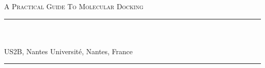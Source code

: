 
\begin{titlepage}
    \colorbox{black!5}{
        \parbox[t]{0.975\textwidth}{%
            \parbox[t]{0.95\textwidth}{%
                \raggedleft\vspace{0.75cm}\Huge\scshape
                A Practical Guide To Molecular Docking \\[7.5pt]
                \large\bf
                \vspace{0.75cm}
            }
        }}

    \vfill

    \parbox[t]{0.95\textwidth}{%
        \hfill\rule{0.15\linewidth}{0.5pt}\\[7.5pt]
        \raggedleft
        \textcopyright{}\\ [4pt]
        US2B, Nantes Université, Nantes, France\\

        \hfill\rule{0.15\linewidth}{0.5pt}}

\end{titlepage}
